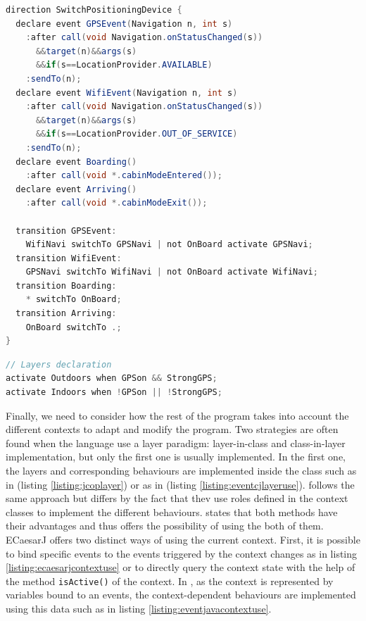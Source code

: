 \documentclass[a4paper]{article}
\begin{document}
\begin{lstlisting}[float, language=Java, caption=EventCJ layer activation, label={listing:eventcjevent}]
direction SwitchPositioningDevice {
  declare event GPSEvent(Navigation n, int s)
    :after call(void Navigation.onStatusChanged(s))
      &&target(n)&&args(s)
      &&if(s==LocationProvider.AVAILABLE)
    :sendTo(n);
  declare event WifiEvent(Navigation n, int s)
    :after call(void Navigation.onStatusChanged(s))
      &&target(n)&&args(s)
      &&if(s==LocationProvider.OUT_OF_SERVICE)
    :sendTo(n);
  declare event Boarding()
    :after call(void *.cabinModeEntered());
  declare event Arriving()
    :after call(void *.cabinModeExit());
  
  transition GPSEvent:
    WifiNavi switchTo GPSNavi | not OnBoard activate GPSNavi;
  transition WifiEvent:
    GPSNavi switchTo WifiNavi | not OnBoard activate WifiNavi;
  transition Boarding:
    * switchTo OnBoard;
  transition Arriving:
    OnBoard switchTo .;
}
\end{lstlisting}

\begin{lstlisting}[float, language=Java, caption=Javanese context declaration, label={listing:javaneselayer}]
// Layers declaration
activate Outdoors when GPSon && StrongGPS;
activate Indoors when !GPSon || !StrongGPS;
\end{lstlisting}

Finally, we need to consider how the rest of the program takes into account the different contexts to adapt and modify the program. Two strategies are often found when the language use a layer paradigm: layer-in-class and class-in-layer implementation, but only the first one is usually implemented. In the first one, the layers and corresponding behaviours are implemented inside the class such as in \cite{appeltauer_improving_2009} \cite{appeltauer_declarative_2013} \cite{wasty_contextlua:_2010} (listing \ref{listing:jcoplayer}) or as in \cite{kamina_eventcj:_2011} \cite{kamina_unified_2013} (listing \ref{listing:eventcjlayeruse}). \cite{kamina_towards_2009} follows the same approach but differs by the fact that thev use roles defined in the context classes to implement the different behaviours. \cite{ghezzi_context_2010} states that both methods have their advantages and thus offers the possibility of using the both of them. ECaesarJ offers two distinct ways of using the current context. First, it is possible to bind specific events to the events triggered by the context changes as in listing \ref{listing:ecaesarjcontextuse} or to directly query the context state with the help of the method \lstinline|isActive()| of the context. In \cite{jayaram_context-oriented_2009}, as the context is represented by variables bound to an events, the context-dependent behaviours are implemented using this data such as in listing \ref{listing:eventjavacontextuse}.
\end{document}
